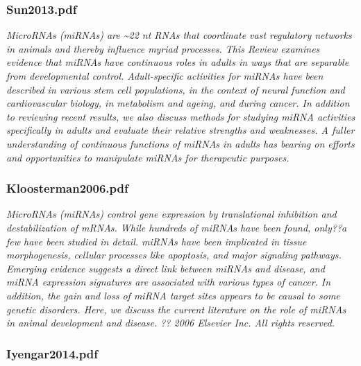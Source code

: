 \documentclass[graybox]{svmult}
\begin{document}
\subsubsection{Sun2013.pdf}

\cite{Sun2013}
\textit{MicroRNAs (miRNAs) are {\~{}}22 nt RNAs that coordinate vast regulatory 
networks in animals and thereby influence myriad processes. This Review examines 
evidence that miRNAs have continuous roles in adults in ways that are separable 
from developmental control. Adult-specific activities for miRNAs have been 
described in various stem cell populations, in the context of neural function 
and cardiovascular biology, in metabolism and ageing, and during cancer. In 
addition to reviewing recent results, we also discuss methods for studying miRNA 
activities specifically in adults and evaluate their relative strengths and 
weaknesses. A fuller understanding of continuous functions of miRNAs in adults 
has bearing on efforts and opportunities to manipulate miRNAs for therapeutic 
purposes.}
\subsubsection{Kloosterman2006.pdf}

\cite{Kloosterman2006}
\textit{MicroRNAs (miRNAs) control gene expression by translational inhibition 
and destabilization of mRNAs. While hundreds of miRNAs have been found, only??a 
few have been studied in detail. miRNAs have been implicated in tissue 
morphogenesis, cellular processes like apoptosis, and major signaling pathways. 
Emerging evidence suggests a direct link between miRNAs and disease, and miRNA 
expression signatures are associated with various types of cancer. In addition, 
the gain and loss of miRNA target sites appears to be causal to some genetic 
disorders. Here, we discuss the current literature on the role of miRNAs in 
animal development and disease. ?? 2006 Elsevier Inc. All rights reserved.}

\subsubsection{Iyengar2014.pdf}
\end{document}
